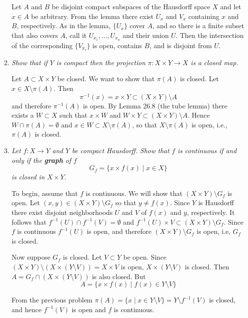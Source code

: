 \documentclass[10pt]{article}
\begin{document}
\begin{enumerate}
Let $A$ and $B$ be disjoint compact subspaces of the Hausdorff space $X$ and let $x \in A$ be arbitrary.  From the lemma there exist $U_x$ and $V_x$ containing $x$ and $B$, respectively.  As in the lemma, $\{U_x\}$ cover $A$, and so there is a finite subset that also covers $A$, call it $U_{x_1}, \ldots, U_{x_n}$ and their union $U$.  Then the intersection of the corresponding $\{V_{x_i}\}$ is open, contains $B$, and is disjoint from $U$.

\item \emph{Show that if $Y$ is compact then the projection $\pi: X \times Y \rightarrow X$ is a closed map.}

Let $A \subset X \times Y$ be closed.  We want to show that $\pi(A)$ is closed.  Let $x \in X \setminus \pi(A)$.  Then $$\pi^{-1}(x) = x \times Y \subset (X \times Y) \setminus A$$ and therefore $\pi^{-1}(A)$ is open.  By Lemma 26.8 (the tube lemma) there exists a $W \subset X$ such that $x \times W$ and $W \times Y \subset (X \times Y) \setminus A$.  Hence $W \cap \pi(A) = \emptyset$ and $x \in W \subset X \setminus \pi(A)$, so that $X \setminus \pi(A)$ is open, i.e., $\pi(A)$ is closed.

\item \emph{Let $f: X \rightarrow Y$ and $Y$ be compact Hausdorff.  Show that $f$ is continuous if and only if the \textbf{graph} of $f$ $$G_f = \{x \times f(x) \mid x \in X\}$$ is closed in $X \times Y$.}

To begin, assume that $f$ is continuous.  We will show that $(X \times Y) \setminus G_f$ is open.  Let $(x,y) \in (X \times Y) \setminus G_f$ so that $y \neq f(x)$.  Since $Y$ is Hausdorff there exist disjoint neighborhoods $U$ and $V$ of $f(x)$ and $y$, respectively.  It follows that $f^{-1}(U) \cap f^{-1}(V) = \emptyset$ and $f^{-1}(U) \times V \subset (X \times Y) \setminus G_f$.  Since $f$ is continuous $f^{-1}(U)$ is open, and therefore $(X \times Y) \setminus G_f$ is open, i.e, $G_f$ is closed.

Now suppose $G_f$ is closed.  Let $V \subset Y$ be open.  Since $(X \times Y) \setminus (X \times (Y \setminus V)) = X \times V$ is open, $X \times (Y \setminus V)$ is closed.  Then $A = G_f \cap \left(X \times (Y \setminus V)\right)$ is also closed.  But
\[
A = \{x \times f(x) \mid f(x) \in Y \setminus V\}
\]

From the previous problem $\pi(A) = \{x \mid x \in Y \setminus V\} = Y \setminus f^{-1}(V)$ is closed, and hence $f^{-1}(V)$ is open and $f$ is continuous.
\end{enumerate}
\end{document}
